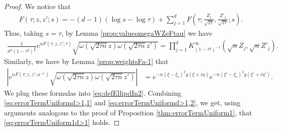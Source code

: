 \documentclass[%
 jmp,
cp,  %
 amsmath,amsthm,amssymb,%
 reprint,%
onecolumn]{revtex4-2}
\begin{document}
    \begin{proof}
    We notice that
    \begin{align*}
    F(\tau;z,z';s) = -(d-1) (\log s - \log \tau) + \sum_{j=1}^d F\left(\tau;\frac{Z_j}{\sqrt{2\tau}}, \frac{Z'_j}{\sqrt{2\tau}};s\right).
    \end{align*}
    Thus, taking $s=\tau$, by 
    Lemma \ref{prop:valueomegaWZeFtau} we have
    \begin{align} \label{eq:errorTermUniformd>1,1}
    \frac{1}{\pi^d (1-\tau^2)^\frac{d}{2}} e^{n F(\tau;z,z';\tau)}
    \sqrt{ \omega\left(\sqrt{2\tau n} z\right)  \omega\left(\sqrt{2\tau n} z'\right)}
    = \prod_{j=1}^d K_{(1-\tau^2)^{-1}}^{\infty}\left(\sqrt n Z_j, \sqrt n Z'_j\right).
    \end{align}
    Similarly, we have by %
    Lemma \ref{prop:weightsFa-1} that
    \begin{align} \label{eq:errorTermUniformd>1,2}
   \left| e^{n F(\tau;z,z';a^{-1})}
    \sqrt{ \omega\left(\sqrt{2\tau n} z\right)  \omega\left(\sqrt{2\tau n} z'\right)}\right|
    &= e^{- n (\xi-\xi_\tau)^2 g(\xi+i\eta)} e^{- n (\xi'-\xi_\tau)^2 g(\xi'+i\eta')}.
    \end{align}
    We plug these formulas into \eqref{eq:defEllipdIn2}. Combining \eqref{eq:errorTermUniformd>1,1} and \eqref{eq:errorTermUniformd>1,2}, we get, using arguments analogous to the proof of Proposition  \ref{thm:errorTermUniform1}, that \eqref{eq:errorTermUniform1d>1} holds. 
    \end{proof}
    
\end{document}
